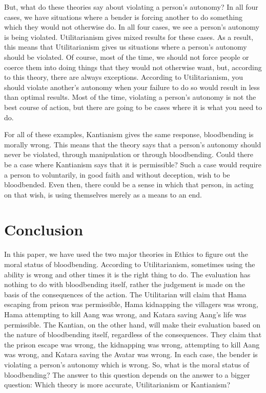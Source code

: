 But, what do these theories say about violating a person’s autonomy? In all four cases, we have situations where a bender is forcing another to do something which they would not otherwise do. In all four cases, we see a person’s autonomy is being violated. Utilitarianism gives mixed results for these cases. As a result, this means that Utilitarianism gives us situations where a person’s autonomy should be violated. Of course, most of the time, we should not force people or coerce them into doing things that they would not otherwise want, but, according to this theory, there are always exceptions. According to Utilitarianism, you should violate another’s autonomy when your failure to do so would result in less than optimal results. Most of the time, violating a person’s autonomy is not the best course of action, but there are going to be cases where it is what you need to do.   

For all of these examples, Kantianism gives the same response, bloodbending is morally wrong. This means that the theory says that a person’s autonomy should never be violated, through manipulation or through bloodbending. Could there be a case where Kantianism says that it is permissible? Such a case would require a person to voluntarily, in good faith and without deception, wish to be bloodbended. Even then, there could be a sense in which that person, in acting on that wish, is using themselves merely as a means to an end.
\section{Conclusion}

In this paper, we have used the two major theories in Ethics to figure out the moral status of bloodbending. According to Utilitarianism, sometimes using the ability is wrong and other times it is the right thing to do. The evaluation has nothing to do with bloodbending itself, rather the judgement is made on the basis of the consequences of the action. The Utilitarian will claim that Hama escaping from prison was permissible, Hama kidnapping the villagers was wrong, Hama attempting to kill Aang was wrong, and Katara saving Aang’s life was permissible. The Kantian, on the other hand, will make their evaluation based on the nature of bloodbending itself, regardless of the consequences. They claim that the prison escape was wrong, the kidnapping was wrong, attempting to kill Aang was wrong, and Katara saving the Avatar was wrong. In each case, the bender is violating a person’s autonomy which is wrong.  So, what is the moral status of bloodbending? The answer to this question depends on the answer to a bigger question: Which theory is more accurate, Utilitarianism or Kantianism?
